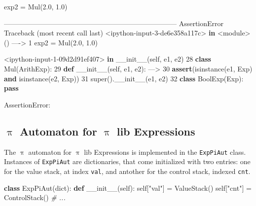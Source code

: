 \documentclass[a4paper,openany]{book}
\newenvironment{Shaded}{}{}
\newcommand{\KeywordTok}[1]{\textcolor[rgb]{0.00,0.44,0.13}{\textbf{{#1}}}}
\newcommand{\DecValTok}[1]{\textcolor[rgb]{0.25,0.63,0.44}{{#1}}}
\newcommand{\FloatTok}[1]{\textcolor[rgb]{0.25,0.63,0.44}{{#1}}}
\newcommand{\StringTok}[1]{\textcolor[rgb]{0.25,0.44,0.63}{{#1}}}
\newcommand{\CommentTok}[1]{\textcolor[rgb]{0.38,0.63,0.69}{\textit{{#1}}}}
\newcommand{\FunctionTok}[1]{\textcolor[rgb]{0.02,0.16,0.49}{{#1}}}
\newcommand{\NormalTok}[1]{{#1}}
\newcommand{\VariableTok}[1]{\textcolor[rgb]{0.10,0.09,0.49}{{#1}}}
\newcommand{\ControlFlowTok}[1]{\textcolor[rgb]{0.00,0.44,0.13}{\textbf{{#1}}}}
\newcommand{\OperatorTok}[1]{\textcolor[rgb]{0.40,0.40,0.40}{{#1}}}
\newcommand{\BuiltInTok}[1]{{#1}}
\newcommand{\PreprocessorTok}[1]{\textcolor[rgb]{0.74,0.48,0.00}{{#1}}}
\begin{document}
\begin{Shaded}
\begin{Highlighting}[]
\NormalTok{exp2 }\OperatorTok{=}\NormalTok{ Mul(}\FloatTok{2.0}\NormalTok{, }\FloatTok{1.0}\NormalTok{)}

\OperatorTok{---------------------------------------------------------------------------}
\PreprocessorTok{AssertionError}\NormalTok{                            Traceback (most recent call last)}
\OperatorTok{<}\NormalTok{ipython}\OperatorTok{-}\BuiltInTok{input}\OperatorTok{-}\DecValTok{3}\OperatorTok{-}\NormalTok{de6e358a117c}\OperatorTok{>} \KeywordTok{in} \OperatorTok{<}\NormalTok{module}\OperatorTok{>}\NormalTok{()}
\OperatorTok{---->} \DecValTok{1}\NormalTok{ exp2 }\OperatorTok{=}\NormalTok{ Mul(}\FloatTok{2.0}\NormalTok{, }\FloatTok{1.0}\NormalTok{)}

\OperatorTok{<}\NormalTok{ipython}\OperatorTok{-}\BuiltInTok{input}\OperatorTok{-}\DecValTok{1}\OperatorTok{-}\NormalTok{09d2d91ef407}\OperatorTok{>} \KeywordTok{in} \FunctionTok{__init__}\NormalTok{(}\VariableTok{self}\NormalTok{, e1, e2)}
     \DecValTok{28} \KeywordTok{class}\NormalTok{ Mul(ArithExp):}
     \DecValTok{29}     \KeywordTok{def} \FunctionTok{__init__}\NormalTok{(}\VariableTok{self}\NormalTok{, e1, e2):}
\OperatorTok{--->} \DecValTok{30}         \ControlFlowTok{assert}\NormalTok{(}\BuiltInTok{isinstance}\NormalTok{(e1, Exp) }\KeywordTok{and} \BuiltInTok{isinstance}\NormalTok{(e2, Exp))}
     \DecValTok{31}         \BuiltInTok{super}\NormalTok{().}\FunctionTok{__init__}\NormalTok{(e1, e2)}
     \DecValTok{32} \KeywordTok{class}\NormalTok{ BoolExp(Exp): }\ControlFlowTok{pass}

\PreprocessorTok{AssertionError}\NormalTok{: }
\end{Highlighting}
\end{Shaded}

\subsection{$\uppi$ Automaton for $\uppi$ lib
Expressions}\label{ux3c0-automaton-for-ux3c0-lib-expressions}

    The $\uppi$ automaton for $\uppi$ lib Expressions is implemented in the
\texttt{ExpPiAut} class. Instances of \texttt{ExpPiAut} are
dictionaries, that come initialized with two entries: one for the value
stack, at index \texttt{val}, and antother for the control stack,
indexed \texttt{cnt}.

\begin{Shaded}
\begin{Highlighting}[]
\KeywordTok{class}\NormalTok{ ExpPiAut(}\BuiltInTok{dict}\NormalTok{):}
    \KeywordTok{def} \FunctionTok{__init__}\NormalTok{(}\VariableTok{self}\NormalTok{):    }
        \VariableTok{self}\NormalTok{[}\StringTok{"val"}\NormalTok{] }\OperatorTok{=}\NormalTok{ ValueStack()}
        \VariableTok{self}\NormalTok{[}\StringTok{"cnt"}\NormalTok{] }\OperatorTok{=}\NormalTok{ ControlStack()}
\CommentTok{# ...}
\end{Highlighting}
\end{Shaded}
\end{document}
